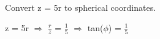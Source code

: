     \vspace{0.5cm}



    \begin{example}
        Convert z = 5r to spherical coordinates.
    \end{example}

    \begin{tbox}
        z = 5r
        \hspace{0.5cm}
        $\Rightarrow$
        \hspace{0.5cm}
        $\frac{r}{z}$ = $\frac{1}{5}$
        \hspace{0.5cm}
        $\Rightarrow$
        \hspace{0.5cm}
        tan($\phi$) = $\frac{1}{5}$
    \end{tbox}




